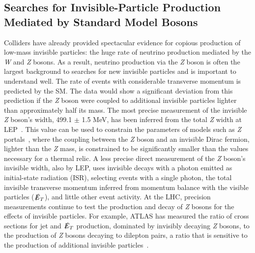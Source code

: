 \documentclass{ar-1col}
\newcommand{\IP}{invisible particle}
\newcommand{\MET}{\ensuremath{\slashed{E}_T}\xspace}
\begin{document}
\subsection{Searches for Invisible-Particle Production Mediated by Standard Model Bosons}\label{sec:results_ZHSearches}

Colliders have already provided spectacular evidence for copious production of low-mass invisible particles: the huge rate of neutrino production
mediated by the \textit{W} and \textit{Z} bosons. As a result, neutrino production via the \textit{Z}
boson is often the largest background to searches for new {\IP}s
and is important to understand well. 
The rate of events with considerable transverse momentum is predicted by the SM.
The data would show a significant deviation from this prediction if 
the \textit{Z} boson were coupled to additional {\IP}s
lighter than approximately half its mass. 
The most precise measurement of
the invisible \textit{Z} boson's width, 499.1 $\pm$ 1.5 MeV, has been inferred from
the total \textit{Z}
width at LEP~\cite{ALEPH:2005ab}. This value can be used to
constrain the parameters of models such as \textit{Z}
portals~\cite{Carena:2003aj,Escudero:2016gzx}, where the coupling
between the \textit{Z} boson and an invisible Dirac fermion, 
lighter than the \textit{Z} mass, is constrained to be
significantly smaller than the values necessary for a thermal relic.
A less precise direct measurement of the \textit{Z} boson's
invisible width, also by LEP, uses invisible decays with a photon
emitted as initial-state radiation (ISR), selecting events with a
single photon, the total invisible transverse momentum inferred
from momentum balance with the visible particles (\MET), and
little other event activity.  At the
LHC, precision measurements continue to test the production and
decay of \textit{Z} bosons for the effects of {\IP}s. 
For example, ATLAS
has measured the ratio of cross sections for jet and \MET
production, dominated by invisibly decaying \textit{Z} bosons, to
the production of \textit{Z} bosons decaying to dilepton pairs, a ratio that
is sensitive to the production of additional
{\IP}s~\cite{Aaboud:2017buf}.
\end{document}
